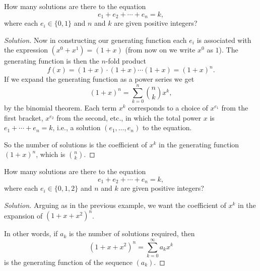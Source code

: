 \documentclass[10pt, a4paper]{article}
\begin{document}
\begin{example}
    How many solutions are there to the equation
    \[
    e_1 + e_2 + \dotsi + e_n = k,
    \]
    where each $e_i \in \{0, 1\}$ and $n$ and $k$ are given positive integers?
    \begin{proof}[Solution]\renewcommand{\qedsymbol}{}
        Now in constructing our generating function each $e_i$ is associated with the expression $(x ^ 0 + x ^ 1) = (1 + x)$
        (from now on we write $x ^ 0$ as $1$).
        The generating function is then the $n$-fold product
        \[
        f(x) = (1 + x)\cdot(1 + x)\dotsi(1 + x) = (1 + x) ^ n.
        \]
        If we expand the generating function as a power series we get
        \[
        (1 + x) ^ n = \sum_{k = 0}^{n}\binom{n}{k}x ^ k,
        \]
        by the binomial theorem.
        Each term $x ^ k$ corresponds to a choice of $x ^ {e_1}$ from the first bracket,
        $x ^ {e_2}$ from the second,
        etc.,
        in which the total power $x$ is $e_1 + \dotsi + e_n = k$,
        i.e.,
        a solution $(e_1, \dotsc, e_n)$ to the equation.

        So the number of solutions is the coefficient of $x ^ k$ in the generating function $(1 + x) ^ n$,
        which is $\binom{n}{k}$.
    \end{proof}
\end{example}

\begin{example}
    How many solutions are there to the equation
    \[
    e_1 + e_2 + \dotsi + e_n = k,
    \]
    where each $e_i \in \{0, 1, 2\}$ and $n$ and $k$ are given positive integers?
    \begin{proof}[Solution]\renewcommand{\qedsymbol}{}
        Arguing as in the previous example,
        we want the coefficient of $x ^ k$ in the expansion of $(1 + x + x ^ 2) ^ n$.
        
        In other words,
        if $a_k$ is the number of solutions required,
        then
        \[
        (1 + x + x ^ 2) ^ n = \sum_{k = 0}^{\infty}a_kx ^ k
        \]
        is the generating function of the sequence $(a_k)$.
    \end{proof}
\end{example}
\end{document}
